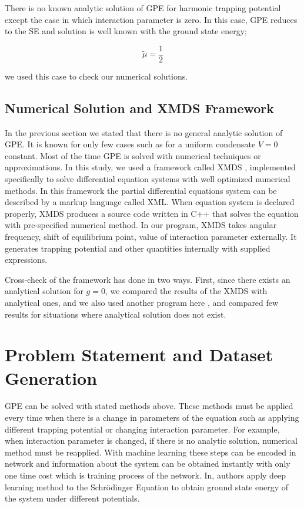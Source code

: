 \documentclass[a4paper,times,12pt]{article}
\begin{document}
There is no known analytic solution of GPE for harmonic trapping potential except the case in which interaction parameter is zero. In this case, GPE reduces to the SE and solution is well known with the ground state energy;

\begin{equation}
\label{eq:GPE_no_inter_GSE}
\widetilde{\mu}= \frac{1}{2}
\end{equation}

\noindent we used this case to check our numerical solutions. 


\subsection{Numerical Solution and XMDS Framework}

In the previous section we stated that there is no general analytic solution of GPE. It is known for only few cases such as for a uniform condensate $V = 0$ constant. Most of the time GPE is solved with numerical techniques or approximations. In this study, we used a framework called XMDS \cite{dennis2013xmds2}, implemented specifically to solve differential equation systems with well optimized numerical methods. In this framework the partial differential equations system can be described by a markup language called XML.  When equation system is declared properly, XMDS produces a source code written in C++ that solves the equation with pre-specified numerical method. In our program, XMDS takes angular frequency, shift of equilibrium point, value of interaction parameter externally. It generates trapping potential and other quantities internally with supplied expressions.


Cross-check of the framework has done in two ways. First, since there exists an analytical solution for $g = 0$, we compared the results of the XMDS with analytical ones, and we also used another program here \cite{muruganandam2009fortran}, and compared few results for situations where analytical solution does not exist.  


\section{Problem Statement and Dataset Generation}
\label{sec:Problem statement}

GPE can be solved with stated methods above. These methods must be applied every time when there is a change in parameters of the equation such as applying different trapping potential or changing interaction parameter. For example, when interaction parameter is changed, if there is no analytic solution, numerical method must be reapplied. With machine learning these steps can be encoded in network and information about the system can be obtained instantly with only one time cost which is training process of the network. In\cite{mills2017deep}, authors apply deep learning method to the Schr{\"o}dinger Equation to obtain ground state energy of the system under different potentials. 
\end{document}
